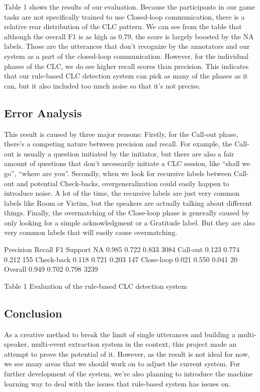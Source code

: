 Table 1 shows the results of our evaluation. Because the participants in our
game tasks are not specifically trained to use Closed-loop communication, there
is a relative rear distribution of the CLC pattern. We can see from the table
that although the overall F1 is as high as 0.79, the score is largely boosted
by the NA labels. Those are the utterances that don’t recognize by the
annotators and our system as a part of the closed-loop communication.  However,
for the individual phases of the CLC, we do see higher recall scores than
precision. This indicates that our rule-based CLC detection system can pick as
many of the phases as it can, but it also included too much noise so that it’s
not precise. 

\subsection{Error Analysis}

This result is caused by three major reasons: Firstly, for the Call-out phase,
there’s a competing nature between precision and recall. For example, the
Call-out is usually a question initiated by the initiator, but there are also a
fair amount of questions that don’t necessarily initiate a CLC session, like
``shall we go'', ``where are you''.  Secondly, when we look for recursive labels
between Call-out and potential Check-backs, overgeneralization could easily
happen to introduce noise. A lot of the time, the recursive labels are just
very common labels like Room or Victim, but the speakers are actually talking
about different things. Finally, the overmatching of the Close-loop phase is
generally caused by only looking for a simple acknowledgment or a Gratitude
label. But they are also very common labels that will easily cause
overmatching.



Precision
Recall
F1
Support
NA
0.985
0.722
0.833
3084
Call-out
0.123
0.774
0.212
155
Check-back
0.118
0.721
0.203
147
Close-loop
0.021
0.550
0.041
20
Overall
0.949
0.702
0.798
3239


Table 1  Evaluation of the rule-based CLC detection system

\subsection{Conclusion}

As a creative method to break the limit of single utterances and building a
multi-speaker, multi-event extraction system in the context, this project made
an attempt to prove the potential of it. However, as the result is not ideal
for now, we see many areas that we should work on to adjust the current system.
For further development of the system, we’re also planning to introduce the
machine learning way to deal with the issues that rule-based system has issues
on. 
